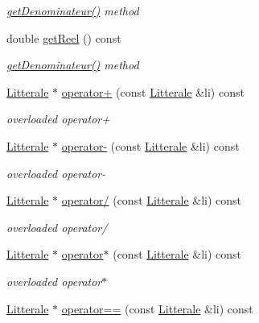 \begin{DoxyCompactItemize}
\begin{DoxyCompactList}\small\item\em \hyperlink{class_li_reelle_a50d6d5764a8cff1ad1676db99c6f2115}{get\+Denominateur()} method \end{DoxyCompactList}\item 
double \hyperlink{class_li_reelle_a2a172ac11b3d20715ba981163da203f3}{get\+Reel} () const 
\begin{DoxyCompactList}\small\item\em \hyperlink{class_li_reelle_a50d6d5764a8cff1ad1676db99c6f2115}{get\+Denominateur()} method \end{DoxyCompactList}\item 
\hyperlink{class_litterale}{Litterale} $\ast$ \hyperlink{class_li_reelle_afb5b649702e7b1a87937d38d0034546f}{operator+} (const \hyperlink{class_litterale}{Litterale} \&li) const 
\begin{DoxyCompactList}\small\item\em overloaded operator+ \end{DoxyCompactList}\item 
\hyperlink{class_litterale}{Litterale} $\ast$ \hyperlink{class_li_reelle_a8347d9889eaaf4b156ca1f4684a14679}{operator-\/} (const \hyperlink{class_litterale}{Litterale} \&li) const 
\begin{DoxyCompactList}\small\item\em overloaded operator-\/ \end{DoxyCompactList}\item 
\hyperlink{class_litterale}{Litterale} $\ast$ \hyperlink{class_li_reelle_affc5e3fd0084475152cba8cc477dc1af}{operator/} (const \hyperlink{class_litterale}{Litterale} \&li) const 
\begin{DoxyCompactList}\small\item\em overloaded operator/ \end{DoxyCompactList}\item 
\hyperlink{class_litterale}{Litterale} $\ast$ \hyperlink{class_li_reelle_a3a9597d7bb98c85ff27a68498cc54533}{operator$\ast$} (const \hyperlink{class_litterale}{Litterale} \&li) const 
\begin{DoxyCompactList}\small\item\em overloaded operator$\ast$ \end{DoxyCompactList}\item 
\hyperlink{class_litterale}{Litterale} $\ast$ \hyperlink{class_li_reelle_a1e70861ad1af93c6639a3f6bd153f3ee}{operator==} (const \hyperlink{class_litterale}{Litterale} \&li) const 

\end{DoxyCompactItemize}
